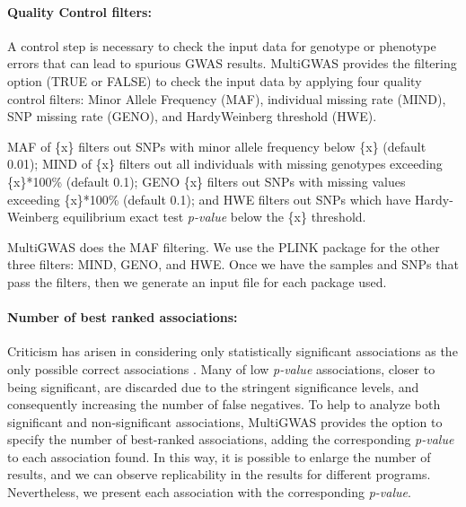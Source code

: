 \documentclass{article}
\begin{document}

\paragraph{Quality Control filters:}
A control step is necessary to check the input data for genotype or phenotype errors that can lead to spurious GWAS results.  MultiGWAS provides the filtering option (TRUE or FALSE) to check the input data by applying four quality control filters: Minor Allele Frequency
(MAF), individual missing rate (MIND), SNP missing rate (GENO), and Hardy\-Weinberg threshold (HWE). 

MAF of \{x\} filters out SNPs with minor allele frequency below \{x\} (default 0.01); MIND of \{x\} filters out all individuals with missing genotypes exceeding \{x\}{*}100\% (default 0.1); GENO \{x\} filters out SNPs with missing values exceeding \{x\}{*}100\% (default 0.1); and HWE filters out SNPs which have Hardy-Weinberg equilibrium exact test \emph{p-value} below the \{x\} threshold.

MultiGWAS does the MAF filtering. We use the PLINK package \cite{Gumpinger2018} for the other three filters: MIND, GENO, and HWE. Once we have the samples and SNPs that pass the filters, then we generate an input file for each package used. 

\paragraph{Number of best ranked associations:}
Criticism has arisen in considering only statistically significant associations as the only possible correct associations \cite{Thomson2011,Kaler2019}. Many of low \emph{p-value} associations, closer to being significant, are discarded due to the stringent significance levels, and consequently increasing the number of false negatives. To help to analyze both significant and non-significant associations, MultiGWAS provides the option to specify the number of best-ranked associations, adding the corresponding  \emph{p-value} to each association found.  In this way, it is possible to enlarge the number of results, and we can observe replicability in the results for different programs. Nevertheless, we present each association with the corresponding \emph{p-value}.%
\end{document}
